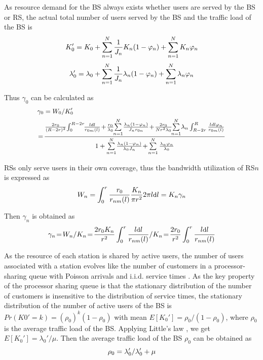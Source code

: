 \documentclass[conference]{IEEEtran}
\begin{document}
\begin{appendix}
 As resource demand for the BS always exists whether users are served by the BS or RS, the actual total number of users served by the BS and the traffic load of the BS is
 \begin{equation}\label{equ:K0'}
 \small{K_0'=K_0+\sum\limits_{n=1}^N\frac{1}{J_n}K_n(1-\varphi_n)+\sum\limits_{n=1}^NK_n\varphi_n}
 \end{equation}
 \begin{equation}\label{equ:lambda_0'}
  \small{\lambda'_0 = \lambda_0+\sum\limits^N_{n=1} \frac{1}{J_n}\lambda_n(1-\varphi_n)+\sum\limits^N_{n=1} \lambda_n\varphi_n}
 \end{equation}

 Thus $\gamma_0$ can be calculated as
 \begin{equation}\label{equ:gamma_0}
 \small{
 \begin{split}
 &\gamma_0 =W_0/K_0' \\
 &\!=\!\frac{\frac{2r_0}{(R-2r)^2}\!\int^{R-2r}_0\!\! \frac{ldl}{r_{0m}(l)}\!+\!\frac{r_0}{\lambda_0}\!\!\sum\limits_{n=1}^N\!\frac{\lambda_n(1-\varphi_n)}{J_nr_{0n}}\!+\!\frac{2r_0}{Nr^2\lambda_0}\!\!\sum\limits_{n=1}^N\!\lambda_n\int_{R-2r}^R\frac{ldl\varphi_n}{r_{0m}(l)}}{1+\sum\limits_{n=1}^N\!\frac{\lambda_n(1-\varphi_n)}{\lambda_0J_n}\!+\!\sum\limits_{n=1}^N\frac{\lambda_n\varphi_n}{\lambda_0}}
 \end{split}
 }
 \end{equation}

 RSs only serve users in their own coverage, thus the bandwidth utilization of RS$n$ is expressed as
 \begin{equation}\label{equ:Wn}
 \small{
 W_n = \int_0^r\frac{r_0}{r_{nm}(l)}\frac{K_n}{\pi r^2}2\pi l\text dl = K_n\gamma_n
 }
 \end{equation}

 Then $\gamma_n$ is obtained as
 \begin{equation}\label{equ:gamma_n}
 \small{
 \gamma_n\!=\!W_n/K_n\!=\!\frac{2r_0K_n}{r^2}\int_0^r\frac{l\text dl}{r_{nm}(l)}/K_n\!=\!\frac{2r_0}{r^2}\int_0^r\frac{l\text dl}{r_{nm}(l)}
 }
 \end{equation}

 As the resource of each station is shared by active users, the number of users associated with a station evolves like the number of customers in a processor-sharing queue with Poisson arrivals and i.i.d. service times \cite{bonald2003wireless}. As the key property of the processor sharing queue is that the stationary distribution of the number of customers is insensitive to the distribution of service times, the stationary distribution of the number of active users of the BS is $Pr(K0'=k)=(\rho_0)^k(1-\rho_0)$ with mean $E[K_0']=\rho_0/(1-\rho_0)$, where $\rho_0$ is the average traffic load of the BS. Applying Little's law \cite{kleinrock1975queueing}, we get $E[K_0']=\lambda_0'/\mu$. Then the average traffic load of the BS $\rho_0$ can be obtained as
 \begin{equation}\label{equ:rho_0}
 \small{
 \rho_0=\lambda_0'/\lambda_0'+\mu
 }
 \end{equation}


\end{appendix}
\end{document}

